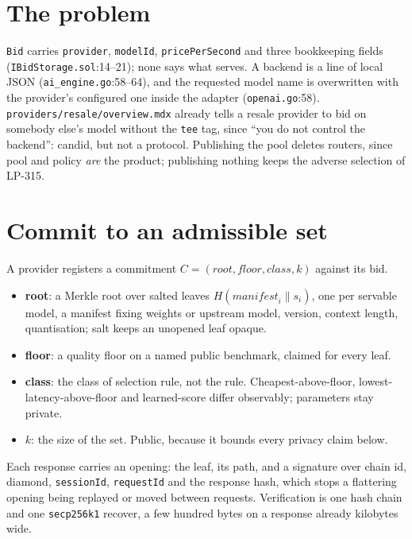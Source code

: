 \documentclass[10pt,a4paper]{article}
\begin{document}
\sloppy


\section*{The problem}

\texttt{Bid} carries \texttt{provider}, \texttt{modelId}, \texttt{pricePerSecond} and three
bookkeeping fields (\texttt{IBidStorage.sol}:14--21); none says what serves. A backend is a line of
local JSON (\texttt{ai\_engine.go}:58--64), and the requested model name is overwritten with the
provider's configured one inside the adapter (\texttt{openai.go}:58).
\texttt{providers/resale/overview.mdx} already tells a resale provider to bid on somebody else's
model without the \texttt{tee} tag, since ``you do not control the backend'': candid, but not a
protocol. Publishing the pool deletes routers, since pool and policy \emph{are} the product;
publishing nothing keeps the adverse selection of LP-315.

\section*{Commit to an admissible set}

A provider registers a commitment $C = (\textit{root}, \textit{floor}, \textit{class}, k)$ against
its bid.

\begin{itemize}
\item \textbf{root}: a Merkle root over salted leaves $H(\textit{manifest}_i \| s_i)$, one per
servable model, a manifest fixing weights or upstream model, version, context length,
quantisation; salt keeps an unopened leaf opaque.
\item \textbf{floor}: a quality floor on a named public benchmark, claimed for every leaf.
\item \textbf{class}: the class of selection rule, not the rule. Cheapest-above-floor,
lowest-latency-above-floor and learned-score differ observably; parameters stay private.
\item $k$: the size of the set. Public, because it bounds every privacy claim below.
\end{itemize}

Each response carries an opening: the leaf, its path, and a signature over chain id, diamond,
\texttt{sessionId}, \texttt{requestId} and the response hash, which stops a flattering opening
being replayed or moved between requests. Verification is one hash chain and one
\texttt{secp256k1} recover, a few hundred bytes on a response already kilobytes wide.
\end{document}
